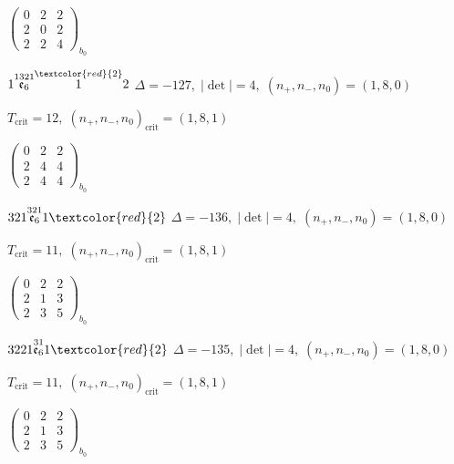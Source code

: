 \documentclass[10pt]{article}
\begin{document}
\hspace{2em}$\left(\begin{smallmatrix}0 & 2 & 2 \\ 2 & 0 & 2 \\ 2 & 2 & 4\end{smallmatrix}\right)_{\!b_0}$

\smallskip

$1\overset{1321}{\mathfrak{e}_6}\overset{\textcolor{red}{2}}{1}2$ \quad $\Delta=-127,\; |\det|=4,\; (n_+,n_-,n_0)=(1,8,0)$

\hspace{1em}$T_{\text{crit}}=12,\; (n_+,n_-,n_0)_{\text{crit}}=(1,8,1)$

\hspace{2em}$\left(\begin{smallmatrix}0 & 2 & 2 \\ 2 & 4 & 4 \\ 2 & 4 & 4\end{smallmatrix}\right)_{\!b_0}$

\smallskip

$321\overset{321}{\mathfrak{e}_6}1\textcolor{red}{2}$ \quad $\Delta=-136,\; |\det|=4,\; (n_+,n_-,n_0)=(1,8,0)$

\hspace{1em}$T_{\text{crit}}=11,\; (n_+,n_-,n_0)_{\text{crit}}=(1,8,1)$

\hspace{2em}$\left(\begin{smallmatrix}0 & 2 & 2 \\ 2 & 1 & 3 \\ 2 & 3 & 5\end{smallmatrix}\right)_{\!b_0}$

\smallskip

$3221\overset{31}{\mathfrak{e}_6}1\textcolor{red}{2}$ \quad $\Delta=-135,\; |\det|=4,\; (n_+,n_-,n_0)=(1,8,0)$

\hspace{1em}$T_{\text{crit}}=11,\; (n_+,n_-,n_0)_{\text{crit}}=(1,8,1)$

\hspace{2em}$\left(\begin{smallmatrix}0 & 2 & 2 \\ 2 & 1 & 3 \\ 2 & 3 & 5\end{smallmatrix}\right)_{\!b_0}$
\end{document}
